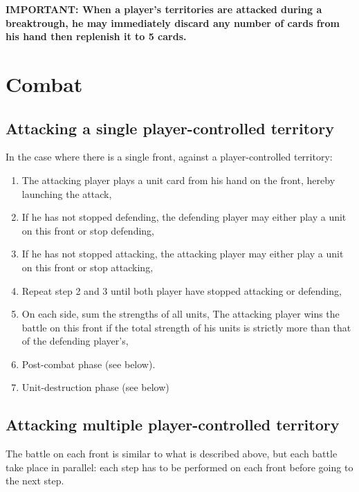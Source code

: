 \documentclass[a4paper]{article}
\begin{document}
    \hspace{-1.5em} \textbf{
    IMPORTANT: When a player's territories are attacked during a breaktrough,
    he may immediately discard any number of cards from his hand then replenish
    it to 5 cards.
    }


\section{Combat}

  \subsection{Attacking a single player-controlled territory}
  
    \hspace{-1.5em} In the case where there is a single front,
    against a player-controlled territory:
    \vspace{-1.3em}
    \begin{enumerate}
        \item The attacking player plays a unit card from his hand on the front,
        hereby launching the attack,
        \item If he has not stopped defending,
        the defending player may either play a unit on this front or stop defending,
        \item If he has not stopped attacking,
        the attacking player may either play a unit on this front or stop attacking,
        \item Repeat step 2 and 3 until both player have stopped attacking or defending,
        \item On each side, sum the strengths of all units,
        The attacking player wins the battle on this front if the total strength
        of his units is strictly more than that of the defending player's,
        \item Post-combat phase (see below).
        \item Unit-destruction phase (see below)
    \end{enumerate}
    

  \subsection{Attacking multiple player-controlled territory}
    
    The battle on each front is similar to what is described above,
    but each battle take place in parallel:
    each step has to be performed on each front before going to the next step.
    
\end{document}
